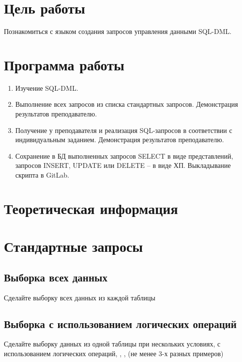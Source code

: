 





\tableofcontents
\newpage

\section{Цель работы}

Познакомиться с языком создания запросов управления данными SQL-DML.

\section{Программа работы}

\begin{enumerate}
	\item Изучение SQL-DML.
	\item Выполнение всех запросов из списка стандартных запросов. Демонстрация результатов преподавателю.
	\item Получение у преподавателя и реализация SQL-запросов в соответствии с индивидуальным заданием. Демонстрация результатов преподавателю.
	\item Сохранение в БД выполненных запросов SELECT в виде представлений, запросов INSERT, UPDATE или DELETE -- в виде ХП. Выкладывание скрипта в GitLab.
\end{enumerate}

\section{Теоретическая информация}

\section{Стандартные запросы}

\subsection{Выборка всех данных}

Сделайте выборку всех данных из каждой таблицы

\subsection{Выборка с использованием логических операций}

Сделайте выборку данных из одной таблицы при нескольких условиях, с использованием логических операций, , ,  (не менее 3-х разных примеров)

